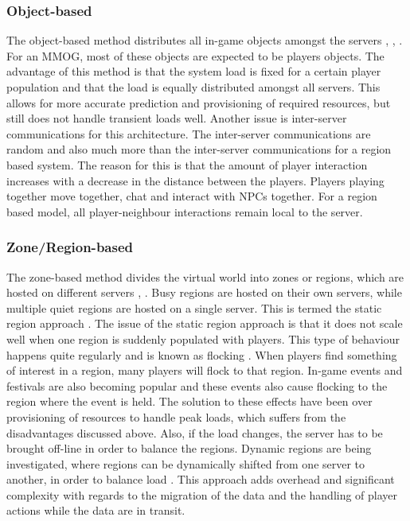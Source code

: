 \documentclass[journal,oneside,a4paper,onecolumn]{IEEEtran}
\begin{document}
\subsubsection{Object-based}
The object-based method distributes all in-game objects amongst the servers \cite{object_based_consistency1}, \cite{object_based_consistency2}, \cite{object_based_consistency3}. For an MMOG, most of these objects are expected to be players objects. The advantage of this method is that the system load is fixed for a certain player population and that the load is equally distributed amongst all servers. This allows for more accurate prediction and provisioning  of required resources, but still does not handle transient loads well. Another issue is inter-server communications for this architecture. The inter-server communications are random and also much more than the inter-server communications for a region based system. The reason for this is that the amount of player interaction increases with a decrease in the distance between the players. Players playing together move together, chat and interact with \acp{NPC} together. For a region based model, all player-neighbour interactions remain local to the server.

\subsubsection{Zone/Region-based}
The zone-based method divides the virtual world into zones or regions, which are hosted on different servers \cite{zone_based_stat}, \cite{zone_based_dyn}. Busy regions are hosted on their own servers, while multiple quiet regions are hosted on a single server. This is termed the static region approach \cite{zone_based_stat}. The issue of the static region approach is that it does not scale well when one region is suddenly populated with players. This type of behaviour happens quite regularly and is known as flocking \cite{flocking}. When players find something of interest in a region, many players will flock to that region. In-game events and festivals are also becoming popular and these events also cause flocking to the region where the event is held. The solution to these effects have been over provisioning of resources to handle peak loads, which suffers from the disadvantages discussed above. Also, if the load changes, the server has to be brought off-line in order to balance the regions. Dynamic regions are being investigated, where regions can be dynamically shifted from one server to another, in order to balance load \cite{zone_based_dyn}. This approach adds overhead and significant complexity with regards to the migration of the data and the handling of player actions while the data are in transit.
\end{document}
